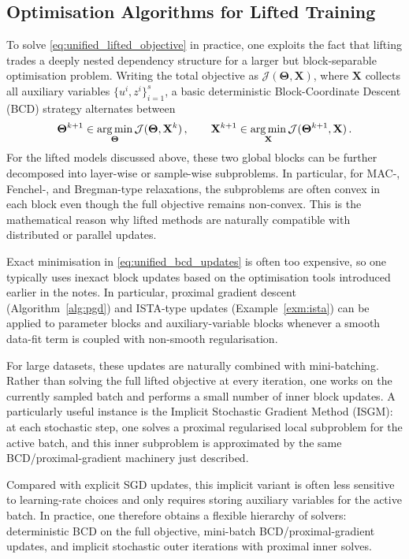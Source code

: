 \subsection{Optimisation Algorithms for Lifted Training}
To solve \eqref{eq:unified_lifted_objective} in practice, one exploits the fact that lifting trades a deeply nested dependency structure for a larger but block-separable optimisation problem. Writing the total objective as $\mathcal{J}(\mathbf{\Theta},\mathbf{X})$, where $\mathbf{X}$ collects all auxiliary variables $\{u^i,z^i\}_{i=1}^s$, a basic deterministic Block-Coordinate Descent (BCD) strategy alternates between
\begin{equation}\label{eq:unified_bcd_updates}
    \mathbf{\Theta}^{k+1} \in \operatorname*{arg\,min}_{\mathbf{\Theta}} \mathcal{J}(\mathbf{\Theta},\mathbf{X}^k) \, , \qquad
    \mathbf{X}^{k+1} \in \operatorname*{arg\,min}_{\mathbf{X}} \mathcal{J}(\mathbf{\Theta}^{k+1},\mathbf{X}) \, .
\end{equation}
For the lifted models discussed above, these two global blocks can be further decomposed into layer-wise or sample-wise subproblems. In particular, for MAC-, Fenchel-, and Bregman-type relaxations, the subproblems are often convex in each block even though the full objective remains non-convex. This is the mathematical reason why lifted methods are naturally compatible with distributed or parallel updates.

Exact minimisation in \eqref{eq:unified_bcd_updates} is often too expensive, so one typically uses inexact block updates based on the optimisation tools introduced earlier in the notes. In particular, proximal gradient descent (Algorithm~\ref{alg:pgd}) and ISTA-type updates (Example~\ref{exm:ista}) can be applied to parameter blocks and auxiliary-variable blocks whenever a smooth data-fit term is coupled with non-smooth regularisation.

For large datasets, these updates are naturally combined with mini-batching. Rather than solving the full lifted objective at every iteration, one works on the currently sampled batch and performs a small number of inner block updates. A particularly useful instance is the Implicit Stochastic Gradient Method (ISGM): at each stochastic step, one solves a proximal regularised local subproblem for the active batch, and this inner subproblem is approximated by the same BCD/proximal-gradient machinery just described.

Compared with explicit SGD updates, this implicit variant is often less sensitive to learning-rate choices and only requires storing auxiliary variables for the active batch. In practice, one therefore obtains a flexible hierarchy of solvers: deterministic BCD on the full objective, mini-batch BCD/proximal-gradient updates, and implicit stochastic outer iterations with proximal inner solves.

